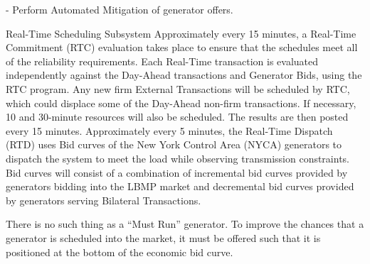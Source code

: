 \documentclass[11pt,a4paper]{article}
\begin{document}
- Perform Automated Mitigation of generator offers.

Real-Time Scheduling Subsystem
Approximately every 15 minutes, a Real-Time Commitment (RTC) evaluation takes place to ensure that the schedules meet all of the reliability requirements. Each Real-Time transaction is evaluated independently against the Day-Ahead transactions and Generator Bids, using the RTC program. Any new firm External Transactions will be scheduled by RTC, which could displace some of the Day-Ahead non-firm transactions. If necessary, 10 and 30-minute resources will also be scheduled. The results are then posted every 15 minutes.
Approximately every 5 minutes, the Real-Time Dispatch (RTD) uses Bid curves of the New York Control Area (NYCA) generators to dispatch the system to meet the load while observing transmission constraints. Bid curves will consist of a combination of incremental bid curves provided by generators bidding into the LBMP market and decremental bid curves provided by generators serving Bilateral Transactions.

There is no such thing as a “Must Run” generator. To improve the chances that a generator is scheduled into the market, it must be offered such that it is positioned at the bottom of the economic bid curve.








\end{document}
